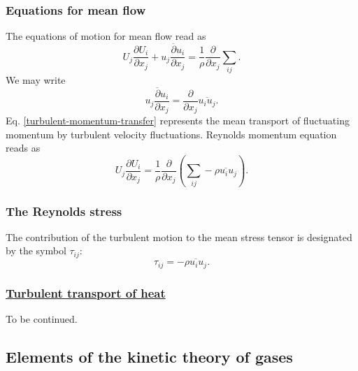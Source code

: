 \documentclass[review]{elsarticle}
\numberwithin{equation}{section}
\begin{document}
	\subsubsection{Equations for mean flow}
		The equations of motion for mean flow read as
		\begin{equation}
			U_j\frac{\partial U_i}{\partial x_j} + \overline{u_j\frac{\partial u_i}{\partial x_j}} = \frac{1}{\rho}\frac{\partial}{\partial x_j}{\sum}_{ij}.
		\end{equation}
		We may write 
		\begin{equation}\label{turbulent-momentum-transfer}
			\overline{u_j\frac{\partial u_i}{\partial x_j}} = \frac{\partial}{\partial x_j}\overline{u_iu_j}.
		\end{equation}
		Eq. \ref{turbulent-momentum-transfer} represents the mean transport of fluctuating momentum by turbulent velocity fluctuations.
		Reynolds momentum equation reads as
		\begin{equation} \label{ReMomEq}
			U_j\frac{\partial U_i}{\partial x_j} = \frac{1}{\rho}\frac{\partial}{\partial x_j}({\sum}_{ij} - \overline{\rho u_iu_j}).
		\end{equation}
	\subsubsection{The Reynolds stress}
		The contribution of the turbulent motion to the mean stress tensor is designated by the symbol $\tau_{ij}$:
		\begin{equation}
			\tau_{ij} = - \overline{\rho u_iu_j}.
		\end{equation}
	\subsubsection{\underline{Turbulent transport of heat}}
		To be continued.
	\subsection{Elements of the kinetic theory of gases}
\end{document}
